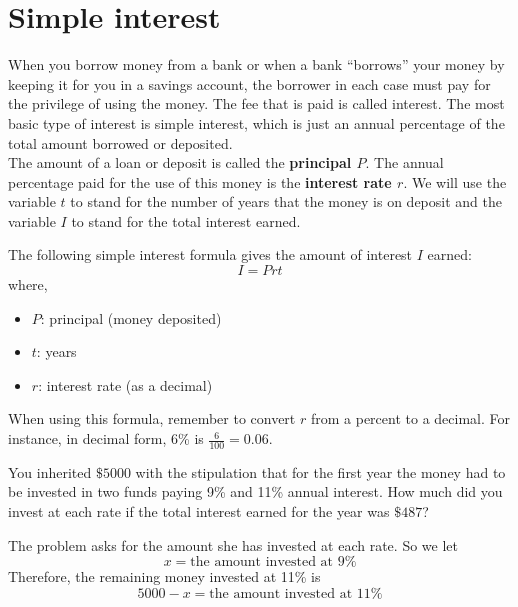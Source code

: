 \section{Simple interest}
When you borrow money from a bank or when a bank “borrows” your money by keeping it for you in a savings account, the borrower in each case must pay for the privilege of using the money. The fee that is paid is called interest. The most basic type of interest is simple interest, which is just an annual percentage of the total amount borrowed or deposited.\\
The amount of a loan or deposit is called the \textbf{principal $P$}. The annual percentage paid for the use of this money is the \textbf{interest rate $r$}. We will use the variable $t$ to stand for the number of years that the money is on deposit and the variable $I$ to stand for the total interest earned.
\begin{tcolorbox}[title=Simple Interest, 
                    fonttitle=\bfseries,
                    colframe=blue!70!red,
                    colback=white]
    The following simple interest formula gives the amount of interest $I$ earned:
    \begin{equation}
                I = Prt
                \label{simple_interest}
    \end{equation}
    where,
    \begin{itemize}
        \item $P$: principal (money deposited)
        \item $t$: years 
        \item $r$: interest rate (as a decimal)
    \end{itemize}
\end{tcolorbox}
%
\begin{nt}
    When using this formula, remember to convert $r$ from a percent to a decimal. For instance, in decimal form, 6\% is
    $\frac{6}{100}=0.06$.
\end{nt}
\begin{exa}
     You inherited $\$5000$ with the stipulation that for the first year the money had to be invested in two funds paying 9\% and 11\% annual interest. How much did you invest at each rate if the total interest earned for the year was $\$487$?
\end{exa}
The problem asks for the amount she has invested at each rate. So
we let \[
                x=\text{the amount invested at 9\%}
\]
Therefore, the remaining money invested at 11\% is
\[
            5000-x = \text{the amount invested at 11\%}
\]
